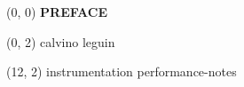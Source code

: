 \documentclass[10pt]{article}
\begin{document}
\begin{textblock}{23}(0, 0)
    \center\huge\textbf{PREFACE}
\end{textblock}

\begin{textblock}{11}(0, 2)
    {calvino}
    {leguin}
\end{textblock}

\begin{textblock}{11}(12, 2)
    {instrumentation}
    {performance-notes}
\end{textblock}
\end{document}
